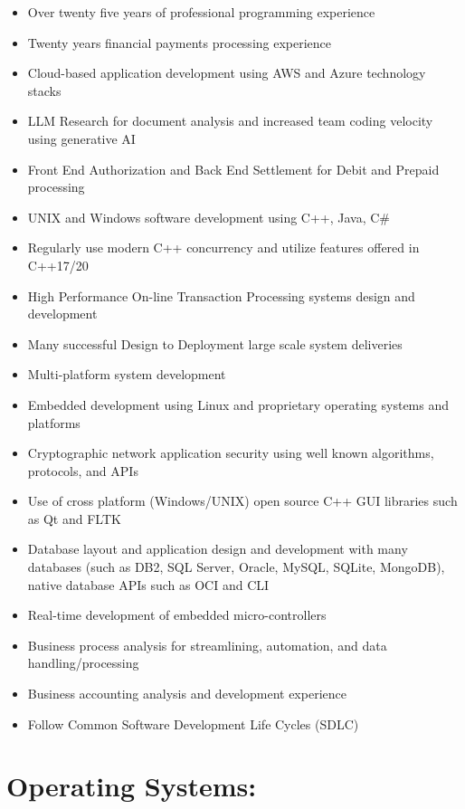 \documentclass[10pt]{report}
\begin{document}
\begin{itemize}

\item Over twenty five years of professional programming experience
\item Twenty years financial payments processing experience
\item Cloud-based application development using AWS and Azure technology stacks
\item LLM Research for document analysis and increased team coding velocity using generative AI
\item Front End Authorization and Back End Settlement for Debit and Prepaid processing
\item UNIX and Windows software development using C++, Java, C\#
\item Regularly use modern C++ concurrency and utilize features offered in C++17/20 
\item High Performance On-line Transaction Processing systems design and development
\item Many successful Design to Deployment large scale system deliveries
\item Multi-platform system development
\item Embedded development using Linux and proprietary operating systems and platforms
\item Cryptographic network application security using well known algorithms, protocols, and APIs
\item Use of cross platform (Windows/UNIX) open source C++ GUI libraries such as Qt and FLTK
\item Database layout and application design and development with many databases (such as DB2, SQL Server, Oracle, MySQL, SQLite, MongoDB), native database APIs such as OCI and CLI
\item Real-time development of embedded micro-controllers
\item Business process analysis for streamlining, automation, and data handling/processing
\item Business accounting analysis and development experience
\item Follow Common Software Development Life Cycles (SDLC)
\end{itemize}



\section*{Operating Systems:}
\end{document}
